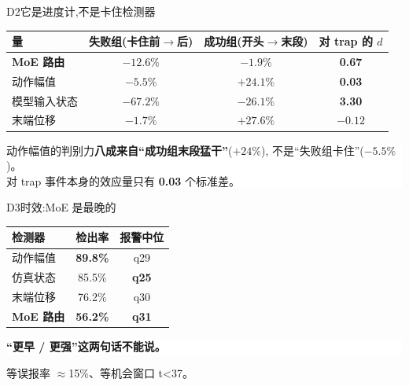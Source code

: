 \documentclass[aspectratio=169,10pt]{beamer}
\newcommand{\hi}[1]{{\color{teal}\bfseries #1}}
\newcommand{\wi}[1]{{\color{gold}\bfseries #1}}
\newcommand{\bad}[1]{{\color{brick}\bfseries #1}}
\newcommand{\dimm}[1]{{\footnotesize\color{gray2}#1}}
\begin{document}
\begin{frame}{D2\quad 它是进度计,不是卡住检测器}
  \small
  \begin{center}
  \begin{tabular}{@{}lccc@{}}
    \toprule
    \textbf{量} & \textbf{失败组(卡住前$\rightarrow$后)} & \textbf{成功组(开头$\rightarrow$末段)} & \textbf{对 trap 的 $d$} \\ \midrule
    \textbf{MoE 路由} & \hi{$-12.6\%$} & $-1.9\%$ & \hi{0.67} \\
    动作幅值          & $-5.5\%$ & \bad{$+24.1\%$} & \bad{0.03} \\
    模型输入状态      & $-67.2\%$ & $-26.1\%$ & \wi{3.30} \\
    末端位移          & $-1.7\%$ & $+27.6\%$ & $-0.12$ \\ \bottomrule
  \end{tabular}
  \end{center}
  \vfill
  \begin{center}
  \colorbox{white}{\parbox{0.9\textwidth}{\vspace{2pt}
    动作幅值的判别力\textbf{八成来自“成功组末段猛干”}($+24\%$),
    不是“失败组卡住”($-5.5\%$)。\\
    对 trap 事件本身的效应量只有 \bad{0.03} 个标准差。\vspace{2pt}}}
  \end{center}
\end{frame}

\begin{frame}{D3\quad 时效:MoE 是最晚的}
  \small\vfill
  \begin{center}
  \begin{tabular}{@{}lcc@{}}
    \toprule
    \textbf{检测器} & \textbf{检出率} & \textbf{报警中位} \\ \midrule
    动作幅值        & \bad{89.8\%} & q29 \\
    仿真状态        & 85.5\% & \bad{q25} \\
    末端位移        & 76.2\% & q30 \\
    \textbf{MoE 路由} & \bad{56.2\%} & \bad{q31} \\ \bottomrule
  \end{tabular}
  \end{center}
  \vfill
  \begin{center}
  \colorbox{white}{\parbox{0.8\textwidth}{\centering\vspace{2pt}
    {\large\bad{“更早 / 更强”这两句话不能说。}}\vspace{2pt}}}
  \end{center}
  \vfill
  \dimm{等误报率 $\approx$15\%、等机会窗口 t<37。}
\end{frame}
\end{document}
